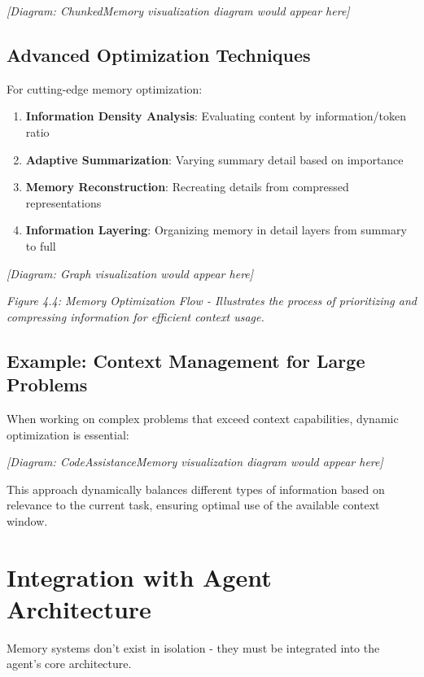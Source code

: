\documentclass[11pt,oneside]{book}
\providecommand{\tightlist}{%
  \setlength{\itemsep}{0pt}\setlength{\parskip}{0pt}}
\begin{document}
\emph{{[}Diagram: ChunkedMemory visualization diagram would appear
here{]}}

\subsection{Advanced Optimization
Techniques}\label{advanced-optimization-techniques}

For cutting-edge memory optimization:

\begin{enumerate}
\def\labelenumi{\arabic{enumi}.}
\tightlist
\item
  \textbf{Information Density Analysis}: Evaluating content by
  information/token ratio
\item
  \textbf{Adaptive Summarization}: Varying summary detail based on
  importance
\item
  \textbf{Memory Reconstruction}: Recreating details from compressed
  representations
\item
  \textbf{Information Layering}: Organizing memory in detail layers from
  summary to full
\end{enumerate}

\emph{{[}Diagram: Graph visualization would appear here{]}}

\emph{Figure 4.4: Memory Optimization Flow - Illustrates the process of
prioritizing and compressing information for efficient context usage.}

\subsection{Example: Context Management for Large
Problems}\label{example-context-management-for-large-problems}

When working on complex problems that exceed context capabilities,
dynamic optimization is essential:

\emph{{[}Diagram: CodeAssistanceMemory visualization diagram would
appear here{]}}

This approach dynamically balances different types of information based
on relevance to the current task, ensuring optimal use of the available
context window.

\section{Integration with Agent
Architecture}\label{integration-with-agent-architecture}

Memory systems don't exist in isolation - they must be integrated into
the agent's core architecture.
\end{document}
